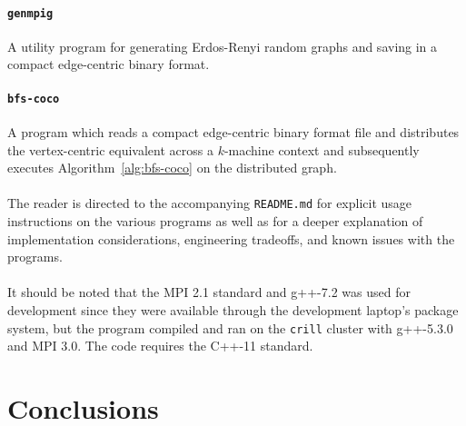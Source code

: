 \documentclass[11pt,epsf]{article}
\newcommand{\TODO}[0]{\textbf{\color{red}{TODO}}}
\begin{document}
{{    \paragraph{\texttt{genmpig}}{
      A utility program for generating Erdos-Renyi random graphs and saving
      in a compact edge-centric binary format.
    }
    \paragraph{\texttt{bfs-coco}}{
      A program which reads a compact edge-centric binary format file and
      distributes the vertex-centric equivalent across a $k$-machine context
      and subsequently executes Algorithm~\ref{alg:bfs-coco} on the distributed graph.
    }
    \paragraph{}{
      The reader is directed to the accompanying \texttt{README.md} for
      explicit usage instructions on the various programs as well as
      for a deeper explanation of implementation considerations,
      engineering tradeoffs, and known issues with the programs.
    }
    \paragraph{}{
      It should be noted that the MPI 2.1 standard\autocite{MPI21} and g++-7.2
      was used for development since they were available through the development
      laptop's package system, but the program compiled and ran on the \texttt{crill}
      cluster with g++-5.3.0 and MPI 3.0. The code requires the C++-11 standard.
    }
  }
}

\section{Conclusions}{
  \paragraph{}{
    \TODO
  }
}

\printbibliography
\end{document}
